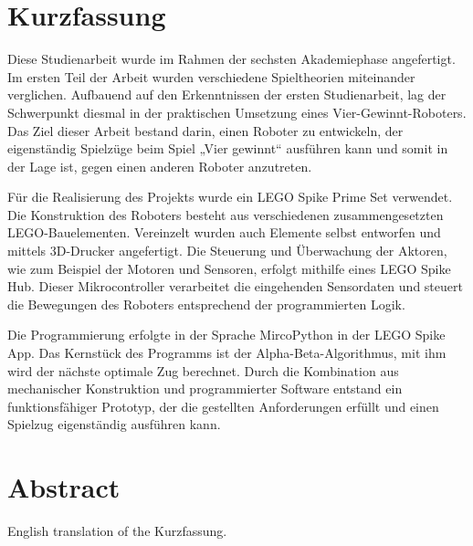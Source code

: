 \chapter*{Kurzfassung} %

%
%
%
 

Diese Studienarbeit wurde im Rahmen der sechsten Akademiephase angefertigt. Im ersten Teil der Arbeit wurden verschiedene Spieltheorien miteinander verglichen.
Aufbauend auf den Erkenntnissen der ersten Studienarbeit, lag der Schwerpunkt diesmal in der praktischen Umsetzung eines Vier-Gewinnt-Roboters. Das Ziel dieser Arbeit bestand darin, einen Roboter zu entwickeln, der eigenständig Spielzüge beim Spiel „Vier gewinnt“ ausführen kann und somit in der Lage ist, gegen einen anderen Roboter anzutreten.

Für die Realisierung des Projekts wurde ein LEGO Spike Prime Set verwendet. Die Konstruktion des Roboters besteht aus verschiedenen zusammengesetzten LEGO-Bauelementen. Vereinzelt wurden auch Elemente selbst entworfen und mittels 3D-Drucker angefertigt.  
Die Steuerung und Überwachung der Aktoren, wie zum Beispiel der Motoren und Sensoren, erfolgt mithilfe eines LEGO Spike Hub. Dieser Mikrocontroller verarbeitet die eingehenden Sensordaten und steuert die Bewegungen des Roboters entsprechend der programmierten Logik.

Die Programmierung erfolgte in der Sprache MircoPython in der LEGO Spike App.
Das Kernstück des Programms ist der Alpha-Beta-Algorithmus, mit ihm wird der nächste optimale Zug berechnet.
Durch die Kombination aus mechanischer Konstruktion und programmierter Software entstand ein funktionsfähiger Prototyp, der die gestellten Anforderungen erfüllt und einen Spielzug eigenständig ausführen kann.

\clearpage

\chapter*{Abstract} %

English translation of the \glqq Kurzfassung\grqq.

\clearpage